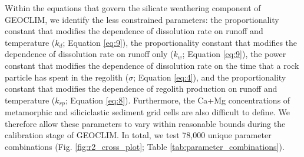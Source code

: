 \documentclass[11pt,letterpaper]{article}
\begin{document}
Within the equations that govern the silicate weathering component of GEOCLIM, we identify the less constrained parameters: the proportionality constant that modifies the dependence of dissolution rate on runoff and temperature ($k_{d}$; Equation \ref{eq:9}), the proportionality constant that modifies the dependence of dissolution rate on runoff only ($k_{w}$; Equation \ref{eq:9}), the power constant that modifies the dependence of dissolution rate on the time that a rock particle has spent in the regolith ($\sigma$; Equation \ref{eq:4}), and the proportionality constant that modifies the dependence of regolith production on runoff and temperature ($k_{rp}$; Equation \ref{eq:8}). Furthermore, the Ca+Mg concentrations of metamorphic and siliciclastic sediment grid cells are also difficult to define. We therefore allow these parameters to vary within reasonable bounds during the calibration stage of GEOCLIM. In total, we test 78,000 unique parameter combinations (Fig. \ref{fig:r2_cross_plot}; Table \ref{tab:parameter_combinations}).
\end{document}

